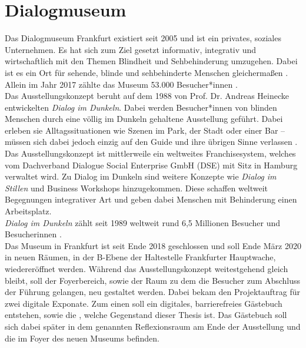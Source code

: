 \section{Dialogmuseum}
\label{sec:dialogmuseum}

Das Dialogmuseum Frankfurt existiert seit 2005 und ist ein privates, soziales 
Unternehmen. Es hat sich zum Ziel gesetzt informativ, integrativ und wirtschaftlich mit 
den Themen Blindheit und Sehbehinderung umzugehen. Dabei ist es ein Ort für sehende, 
blinde und sehbehinderte Menschen gleichermaßen \cite{dialogmuseum}. Allein im Jahr 2017 zählte das Museum 53.000 
Besucher*innen \cite{besucher}.\\

Das Ausstellungskonzept beruht auf dem 1988 von Prof. Dr. Andreas Heinecke entwickelten
\emph{Dialog im Dunkeln}. Dabei werden Besucher*innen von blinden Menschen durch eine 
völlig im Dunkeln gehaltene Ausstellung geführt. Dabei erleben sie Alltagssituationen
wie Szenen im Park, der Stadt oder einer Bar -- müssen sich dabei jedoch einzig auf
den Guide und ihre übrigen Sinne verlassen \cite{dialogmuseum}.\\
Das Ausstellungskonzept ist mittlerweile ein weltweites Franchisesystem, welches vom 
Dachverband Dialogue Social Enterprise GmbH (DSE) \cite{dachverband} mit Sitz in Hamburg verwaltet wird.
Zu Dialog im Dunkeln sind weitere Konzepte wie \emph{Dialog im Stillen} und Business Workshops
hinzugekommen. Diese schaffen weltweit Begegnungen integrativer Art und geben dabei 
Menschen mit Behinderung einen Arbeitsplatz.\\
\emph{Dialog im Dunkeln} zählt seit 1989 weltweit rund 6,5 Millionen Besucher und Besucherinnen
\cite{weltweit}.\\

Das Museum in Frankfurt ist seit Ende 2018 geschlossen und soll Ende März 2020 in neuen Räumen, in der B-Ebene
der Haltestelle Frankfurter Hauptwache, wiedereröffnet werden. Während das Ausstellungskonzept
weitestgehend gleich bleibt, soll der Foyerbereich, sowie der Raum zu dem die Besucher zum Abschluss
der Führung gelangen, neu gestaltet werden. Dabei bekam \meso{} den Projektauftrag für zwei
digitale Exponate. Zum einen soll ein digitales, barrierefreies Gästebuch entstehen, sowie die
\shst{}, welche Gegenstand dieser Thesis ist. Das Gästebuch soll sich dabei später in dem 
genannten Reflexionsraum am Ende der Ausstellung und die \shst{} im Foyer des neuen Museums befinden.
